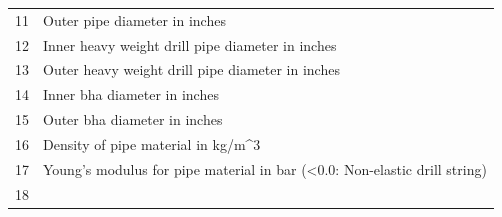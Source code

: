 \begin{longtable}[]{@{}ll@{}}
\begin{minipage}[t]{0.06\columnwidth}
11\strut
\end{minipage} & \begin{minipage}[t]{0.89\columnwidth}\raggedright
Outer pipe diameter in inches\strut
\end{minipage}\tabularnewline
\begin{minipage}[t]{0.06\columnwidth}\raggedright
12\strut
\end{minipage} & \begin{minipage}[t]{0.89\columnwidth}\raggedright
Inner heavy weight drill pipe diameter in inches\strut
\end{minipage}\tabularnewline
\begin{minipage}[t]{0.06\columnwidth}\raggedright
13\strut
\end{minipage} & \begin{minipage}[t]{0.89\columnwidth}\raggedright
Outer heavy weight drill pipe diameter in inches\strut
\end{minipage}\tabularnewline
\begin{minipage}[t]{0.06\columnwidth}\raggedright
14\strut
\end{minipage} & \begin{minipage}[t]{0.89\columnwidth}\raggedright
Inner bha diameter in inches\strut
\end{minipage}\tabularnewline
\begin{minipage}[t]{0.06\columnwidth}\raggedright
15\strut
\end{minipage} & \begin{minipage}[t]{0.89\columnwidth}\raggedright
Outer bha diameter in inches\strut
\end{minipage}\tabularnewline
\begin{minipage}[t]{0.06\columnwidth}\raggedright
16\strut
\end{minipage} & \begin{minipage}[t]{0.89\columnwidth}\raggedright
Density of pipe material in kg/m\^{}3\strut
\end{minipage}\tabularnewline
\begin{minipage}[t]{0.06\columnwidth}\raggedright
17\strut
\end{minipage} & \begin{minipage}[t]{0.89\columnwidth}\raggedright
Young's modulus for pipe material in bar (\textless{}0.0: Non-elastic
drill string)\strut
\end{minipage}\tabularnewline
\begin{minipage}[t]{0.06\columnwidth}\raggedright
18\strut
\end{minipage} & \begin{minipage}[t]{0.89\columnwidth}\raggedright

\end{minipage}
\end{longtable}
